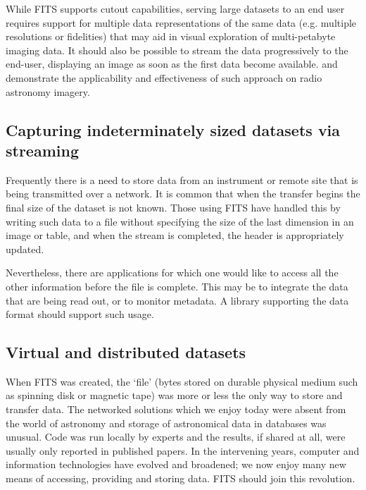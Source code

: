 \documentclass[final,authoryear,5p,times,twocolumn]{elsarticle}
\begin{document}
{{While FITS supports cutout capabilities, serving large datasets to an 
end user requires support for multiple data representations
of the same data (e.g. multiple resolutions or fidelities)
that may aid in visual exploration of multi-petabyte imaging data.
It should also be possible to stream the data
progressively to the end-user, displaying an image as soon
as the first data become available. \citet{2014Kitaeff} and
\citet{2014arXiv1401.7433P}  demonstrate the applicability and effectiveness
of such approach on radio astronomy imagery.


\subsection{Capturing indeterminately sized datasets via streaming}
\label{subsection_stream_indeterm}


Frequently there is a need to store data from an instrument or remote
site that is being transmitted over a network. It is common that when
the transfer begins the final size of the dataset is not known. Those
using FITS have handled this by writing such data to a file without
specifying the size of the last dimension in an image or table, and
when the stream is completed, the header is appropriately updated.


Nevertheless, there are applications for which one would like to
access all the other information before the file is complete. This may
be to integrate the data that are being read out, or to monitor
metadata. A library supporting the data format should support such
usage.


\subsection{Virtual and distributed datasets}
\label{subsection_virt_dist_components}


When FITS was created, the `file' (bytes stored on durable physical
medium such as spinning disk or magnetic tape) was more or less the
only way to store and transfer data. The networked solutions which we
enjoy today were absent from the world of astronomy and storage of
astronomical data in databases was unusual. Code was run locally by
experts and the results, if shared at all, were usually only reported
in published papers. In the intervening years, computer and
information technologies have evolved and broadened; we now enjoy many
new means of accessing, providing and storing data. FITS should join
this revolution.


}}
\end{document}
